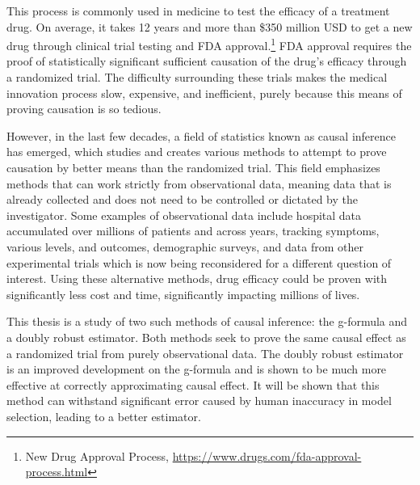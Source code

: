  This process is commonly used in medicine to test the efficacy of a treatment drug.  On average, it takes 12 years and more than \$350 million USD to get a new drug through clinical trial testing and FDA approval.\footnote{New Drug Approval Process, \url{https://www.drugs.com/fda-approval-process.html}}  FDA approval requires the proof of statistically significant sufficient causation of the drug's efficacy through a randomized trial.  The difficulty surrounding these trials makes the medical innovation process slow, expensive, and inefficient, purely because this means of proving causation is so tedious.  
 
However, in the last few decades, a field of statistics known as causal inference has emerged, which studies and creates various methods to attempt to prove causation by better means than the randomized trial.  This field emphasizes methods that can work strictly from observational data, meaning data that is already collected and does not need to be controlled or dictated by the investigator.  Some examples of observational data include hospital data accumulated over millions of patients and across years, tracking symptoms, various levels, and outcomes, demographic surveys, and data from other experimental trials which is now being reconsidered for a different question of interest.  Using these alternative methods, drug efficacy could be proven with significantly less cost and time, significantly impacting millions of lives.  

This thesis is a study of two such methods of causal inference: the g-formula and a doubly robust estimator.  Both methods seek to prove the same causal effect as a randomized trial from purely observational data.  The doubly robust estimator is an improved development on the g-formula and is shown to be much more effective at correctly approximating causal effect.  It will be shown that this method can withstand significant error caused by human inaccuracy in model selection, leading to a better estimator.  




